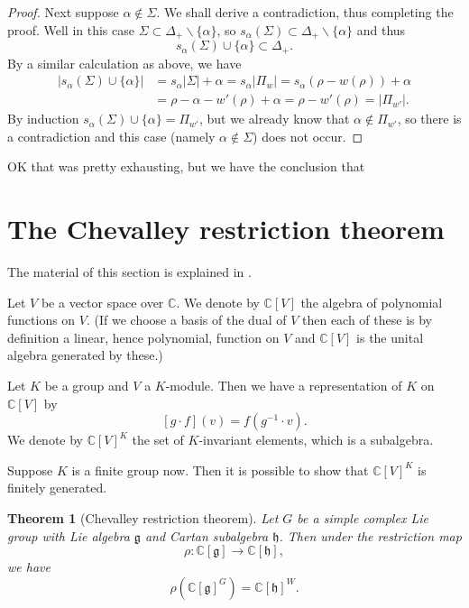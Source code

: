 \documentclass[12pt]{article}
\theoremstyle{plain}
\newtheorem{thm}{Theorem}[section]
\theoremstyle{definition}
\numberwithin{equation}{section}
\newcommand{\al}{\alpha}
\newcommand{\D}{\Delta}
\newcommand{\C}{\mathbb{C}}
\newcommand{\g}{\mathfrak{g}}
\newcommand{\h}{\mathfrak{h}}
\begin{document}
\begin{proof}
Next suppose $\al \notin \Sigma$. We shall derive a contradiction, thus completing the proof. Well in this case $\Sigma \subset \D_+ \backslash \{\al\}$, so $s_\al(\Sigma) \subset \D_+ \backslash \{\al\}$ and thus
\[
s_\al(\Sigma) \cup \{\al\} \subset \D_+.
\]
By a similar calculation as above, we have
\begin{align*}
|s_\al(\Sigma) \cup \{\al\}| &= s_\al|\Sigma| + \al = s_\al|\Pi_w| = s_\al(\rho - w(\rho)) + \al \\
%
&= \rho - \al - w'(\rho) + \al = \rho - w'(\rho) = |\Pi_{w'}|.
\end{align*}
By induction $s_\al(\Sigma) \cup \{\al\} = \Pi_{w'}$, but we already know that $\al \notin \Pi_{w'}$, so there is a contradiction and this case (namely $\al \notin \Sigma$) does not occur.

\end{proof}

OK that was pretty exhausting, but we have the conclusion that



\section{The Chevalley restriction theorem}

The material of this section is explained in {\cite[Chapter 10]{HTT}}.

Let $V$ be a vector space over $\C$. We denote by $\C[V]$ the algebra of polynomial functions on $V$. (If we choose a basis of the dual of $V$ then each of these is by definition a linear, hence polynomial, function on $V$ and $\C[V]$ is the unital algebra generated by these.)

Let $K$ be a group and $V$ a $K$-module. Then we have a representation of $K$ on $\C[V]$ by
\[
[g \cdot f](v) = f(g^{-1} \cdot v).
\]
We denote by $\C[V]^K$ the set of $K$-invariant elements, which is a subalgebra.

Suppose $K$ is a finite group now. Then it is possible to show that $\C[V]^K$ is finitely generated.

\begin{thm}[Chevalley restriction theorem]
Let $G$ be a simple complex Lie group with Lie algebra $\g$ and Cartan subalgebra $\h$. Then under the restriction map
\[
\rho : \C[\g] \rightarrow \C[\h],
\]
we have
\[
\rho(\C[\g]^G) = \C[\h]^W.
\]
\end{thm}
\end{document}
